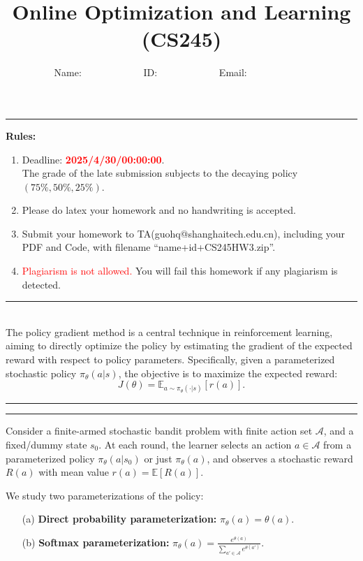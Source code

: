 \documentclass[11pt,oneside,a4paper]{article}
\title{Online Optimization and Learning (CS245)}
\author{Name: ~~~~~~~~~~~~ID: ~~~~~~~~~~~~Email: ~~~~~~~~~~~~}
\date{}
\begin{document}
\maketitle
\noindent
\rule{\linewidth}{0.4pt}
{\bf {\large Rules:}}
\begin{enumerate} 
    \item Deadline: \textcolor{red}{\textbf{2025/4/30/00:00:00}}.\\ The grade of the late submission subjects to the decaying policy $(75\%, 50\%, 25\%)$.
    \item Please do latex your homework and no handwriting is accepted.
    \item Submit your homework to TA(guohq@shanghaitech.edu.cn), including your PDF and Code, with filename ``{\sf name+id+CS245HW3.zip}''.
    \item \textcolor{red}{Plagiarism is not allowed.} You will fail this homework if any plagiarism is detected.
    \end{enumerate}
    \vspace{-0.3cm}
\rule{\linewidth}{0.4pt}

\newpage

 \\

\noindent The policy gradient method is a central technique in reinforcement learning, aiming to directly optimize the policy by estimating the gradient of the expected reward with respect to policy parameters. Specifically, given a parameterized stochastic policy $\pi_\theta(a|s)$, the objective is to maximize the expected reward:
\[
J(\theta) = \mathbb{E}_{a \sim \pi_\theta(\cdot|s)}[r(a)].
\]

\vspace{0.1in}
\hrule
\vspace{0.05in}
\vspace{0.05in}
\hrule
\vspace{0.05in}
 Consider a finite-armed stochastic bandit problem with finite action set $\mathcal{A}$, and a fixed/dummy state $s_0$. At each round, the learner selects an action $a \in \mathcal{A}$ from a parameterized policy $\pi_\theta(a|s_0)$ or just $\pi_\theta(a)$, and observes a stochastic reward $R(a)$ with mean value $r(a) = \mathbb E[R(a)].$

We study two parameterizations of the policy:
\begin{itemize}
    \item[(a)] {\bf Direct probability parameterization:} $\pi_\theta(a) = \theta(a).$
    \item[(b)] {\bf Softmax parameterization:} $\pi_\theta(a) = \frac{e^{\theta(a)}}{\sum_{a' \in \mathcal{A}} e^{\theta(a')}}$.
\end{itemize}
\end{document}
